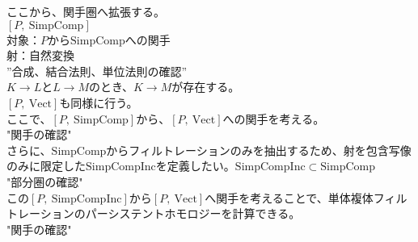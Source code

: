 \documentclass{article}
\theoremstyle{definition}
\newcommand{\SimpComp}{{\mathrm{SimpComp}}}
\newcommand{\Fun}[2]{[#1,~#2]}
\newcommand{\Vect}{{\mathrm{Vect}}}
\newcommand{\SimpCompInc}{{\mathrm{SimpCompInc}}}
\begin{document}
ここから、関手圏へ拡張する。\\
$\Fun{P}{\SimpComp}$\\
対象：$P$から$\SimpComp$への関手\\
射：自然変換\\
”合成、結合法則、単位法則の確認”\\
$K \rightarrow L$と$L \rightarrow M$のとき、$K\rightarrow M$が存在する。\\


$\Fun{P}{\Vect}$も同様に行う。\\

ここで、$\Fun{P}{\SimpComp}$から、$\Fun{P}{\Vect}$への関手を考える。\\
"関手の確認"\\


さらに、$\SimpComp$からフィルトレーションのみを抽出するため、射を包含写像のみに限定した$\SimpCompInc$を定義したい。$\SimpCompInc \subset \SimpComp$\\
"部分圏の確認"\\


この$\Fun{P}{\SimpCompInc}$から$\Fun{P}{\Vect}$へ関手を考えることで、単体複体フィルトレーションのパーシステントホモロジーを計算できる。\\
"関手の確認"
\end{document}
